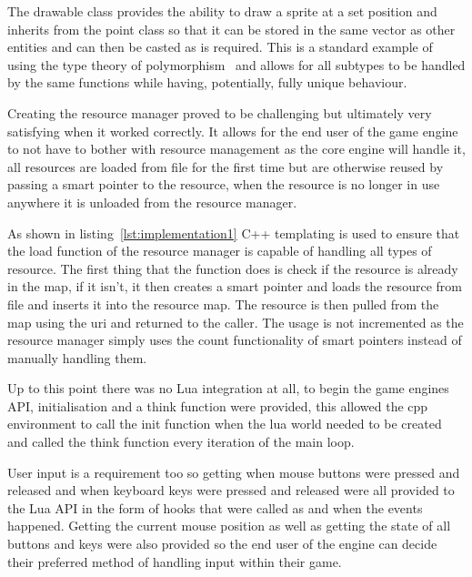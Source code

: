 \documentclass[11pt,a4paper,titlepage]{report}
\begin{document}
    The drawable class provides the ability to draw a sprite at a set position and inherits from the point class so that it can be stored in the same vector as other entities and can then be casted as is required. This is a standard example of using the type theory of polymorphism~\cite{PolymorphismDef} and allows for all subtypes to be handled by the same functions while having, potentially, fully unique behaviour.
	

	Creating the resource manager proved to be challenging but ultimately very satisfying when it worked correctly. It allows for the end user of the game engine to not have to bother with resource management as the core engine will handle it, all resources are loaded from file for the first time but are otherwise reused by passing a smart pointer to the resource, when the resource is no longer in use anywhere it is unloaded from the resource manager.
	
	

	As shown in listing~\ref{lst:implementation1} C++ templating is used to ensure that the load function of the resource manager is capable of handling all types of resource. The first thing that the function does is check if the resource is already in the map, if it isn't, it then creates a smart pointer and loads the resource from file and inserts it into the resource map. The resource is then pulled from the map using the uri and returned to the caller. The usage is not incremented as the resource manager simply uses the count functionality of smart pointers instead of manually handling them.


    Up to this point there was no Lua integration at all, to begin the game engines API, initialisation and a think function were provided, this allowed the cpp environment to call the init function when the lua world needed to be created and called the think function every iteration of the main loop.

    User input is a requirement too so getting when mouse buttons were pressed and released and when keyboard keys were pressed and released were all provided to the Lua API in the form of hooks that were called as and when the events happened. Getting the current mouse position as well as getting the state of all buttons and keys were also provided so the end user of the engine can decide their preferred method of handling input within their game.
\end{document}
